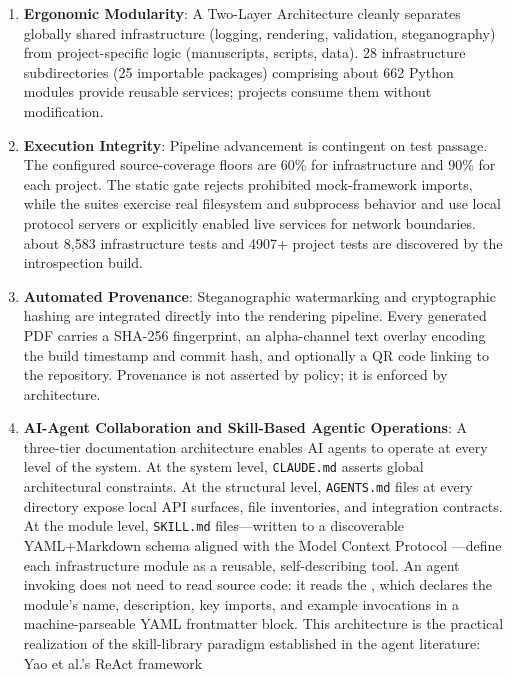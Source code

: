 \documentclass[
  english,
]{article}
\begin{document}
\begin{enumerate}
\def\labelenumi{\arabic{enumi}.}
\item
  \textbf{Ergonomic Modularity}: A Two-Layer Architecture cleanly
  separates globally shared infrastructure (logging, rendering,
  validation, steganography) from project-specific logic (manuscripts,
  scripts, data). 28 infrastructure subdirectories (25 importable
  packages) comprising about 662 Python modules provide
  reusable services; projects consume them without modification.
\item
  \textbf{Execution Integrity}: Pipeline advancement is contingent on
  test passage. The configured source-coverage floors are 60\% for
  infrastructure and 90\% for each project. The static gate rejects
  prohibited mock-framework imports, while the suites exercise real
  filesystem and subprocess behavior and use local protocol servers or
  explicitly enabled live services for network boundaries.
  about 8,583 infrastructure tests and 4907+ project tests are
  discovered by the introspection build.
\item
  \textbf{Automated Provenance}: Steganographic watermarking and
  cryptographic hashing are integrated directly into the rendering
  pipeline. Every generated PDF carries a SHA-256 fingerprint, an
  alpha-channel text overlay encoding the build timestamp and commit
  hash, and optionally a QR code linking to the repository. Provenance
  is not asserted by policy; it is enforced by architecture.
\item
  \textbf{AI-Agent Collaboration and Skill-Based Agentic Operations}: A
  three-tier documentation architecture enables AI agents to operate at
  every level of the system. At the system level, \texttt{CLAUDE.md}
  asserts global architectural constraints. At the structural level,
  \texttt{AGENTS.md} files at every directory expose local API surfaces,
  file inventories, and integration contracts. At the module level,
  \texttt{SKILL.md} files---written to a discoverable YAML+Markdown
  schema aligned with the Model Context Protocol
  \citep{anthropic2024mcp}---define each infrastructure module as a
  reusable, self-describing tool. An agent invoking
   does not need to read source code:
  it reads the , which declares the module's
  name, description, key imports, and example invocations in a
  machine-parseable YAML frontmatter block. This architecture is the
  practical realization of the skill-library paradigm established in the
  agent literature: Yao et al.'s ReAct framework \citep{yao2023react}

\end{enumerate}
\end{document}
